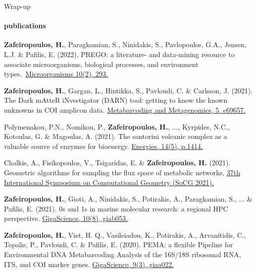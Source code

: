 \documentclass{beamer}
\begin{document}
   \begin{frame}[label=bibliography]{Wrap-up}
      \framesubtitle{publications}
      
      \begin{thebibliography}{9}

         \tiny
            \textbf{Zafeiropoulos, H.}, Paragkamian, S., Ninidakis, S., Pavlopoulos, G.A., Jensen, L.J. \& Pafilis, E. (2022). PREGO: a literature- and data-mining resource to associate microorganisms, biological processes, and environment types.~\href{https://www.mdpi.com/1469654}{Microorganisms  10(2), 293.}

         \tiny
            \textbf{Zafeiropoulos, H.}, Gargan, L., Hintikka, S., Pavloudi, C. \& Carlsson, J. (2021). The Dark mAtteR iNvestigator (DARN) tool: getting to know the known unknowns in COI amplicon data. \href{https://mbmg.pensoft.net/article/69657/list/9/}{Metabarcoding and Metagenomics, 5, e69657.}

         \tiny
            Polymenakou, P.N., Nomikou, P., \textbf{Zafeiropoulos, H.}, ..., Kyrpides, N.C., Kotoulas, G. \& Magoulas, A. (2021). 
            The santorini volcanic complex as a valuable source of enzymes for bioenergy. 
            \href{https://doi.org/10.3390/en14051414}{Energies, 14(5), p.1414.}
   
         \tiny
            Chalkis, A., Fisikopoulos, V., Tsigaridas, E. \& \textbf{Zafeiropoulos, H.} (2021). Geometric algorithms for sampling the flux space of metabolic networks, \href{ https://drops.dagstuhl.de/opus/volltexte/2021/13820/}{37th International Symposium on Computational Geometry (SoCG 2021).}

         \tiny
            \textbf{Zafeiropoulos, H.}, Gioti, A., Ninidakis, S., Potirakis, A., Paragkamian, S., ... \& Pafilis, E. (2021). 0s and 1s in marine molecular research: a regional HPC perspective. \href{https://academic.oup.com/gigascience/article/10/8/giab053/6353916}{GigaScience, 10(8), giab053.}

         \tiny
         \textbf{Zafeiropoulos, H.}, Viet, H. Q., Vasileiadou, K., Potirakis, A., Arvanitidis, C., Topalis, P., Pavloudi, C. \& Pafilis, E. (2020). PEMA: a flexible Pipeline for Environmental DNA Metabarcoding Analysis of the 16S/18S ribosomal RNA, ITS, and COI marker genes. \href{https://academic.oup.com/gigascience/article/9/3/giaa022/5803335}{GigaScience, 9(3), giaa022.}


\end{thebibliography}
\end{frame}
\end{document}
